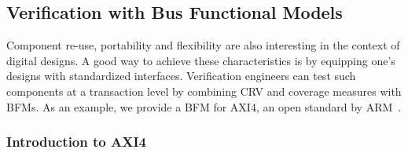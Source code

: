 \documentclass[conference]{IEEEtran}
\begin{document}
%

\subsection{Verification with Bus Functional Models}

Component re-use, portability and flexibility are also interesting in the context of digital 
designs. A good way to achieve these characteristics is by equipping one's designs with standardized 
interfaces. Verification engineers can test such components at a transaction level by combining CRV 
and coverage measures with BFMs. As an example, we provide a BFM for AXI4, an open standard by 
ARM~\cite{axi4standard}.

\subsubsection{Introduction to AXI4}
\end{document}
